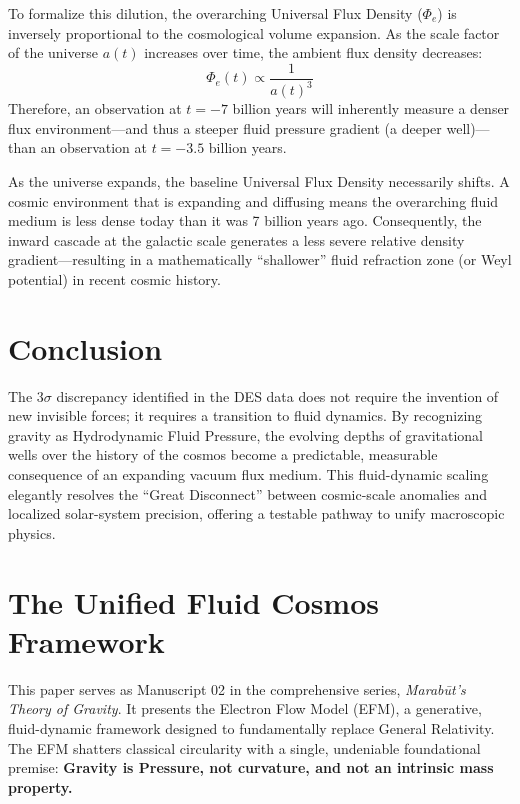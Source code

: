\documentclass[11pt, a4paper]{article}
\begin{document}
To formalize this dilution, the overarching Universal Flux Density ($\Phi_e$) is inversely proportional to the cosmological volume expansion. As the scale factor of the universe $a(t)$ increases over time, the ambient flux density decreases:
\begin{equation}
  \Phi_e(t) \propto \frac{1}{a(t)^3}
\end{equation}
Therefore, an observation at $t = -7$ billion years will inherently measure a denser flux environment---and thus a steeper fluid pressure gradient (a deeper well)---than an observation at $t = -3.5$ billion years.

As the universe expands, the baseline Universal Flux Density necessarily shifts. A cosmic environment that is expanding and diffusing means the overarching fluid medium is less dense today than it was 7 billion years ago. Consequently, the inward cascade at the galactic scale generates a less severe relative density gradient---resulting in a mathematically ``shallower'' fluid refraction zone (or Weyl potential) in recent cosmic history.

\section{Conclusion}
The $3\sigma$ discrepancy identified in the DES data does not require the invention of new invisible forces; it requires a transition to fluid dynamics. By recognizing gravity as Hydrodynamic Fluid Pressure, the evolving depths of gravitational wells over the history of the cosmos become a predictable, measurable consequence of an expanding vacuum flux medium. This fluid-dynamic scaling elegantly resolves the ``Great Disconnect'' between cosmic-scale anomalies and localized solar-system precision, offering a testable pathway to unify macroscopic physics.

\clearpage
\section*{The Unified Fluid Cosmos Framework}
  This paper serves as Manuscript 02 in the comprehensive series, \textit{Marab\={u}t's Theory of Gravity}. It presents the Electron Flow Model (EFM), a generative, fluid-dynamic framework designed to fundamentally replace General Relativity. The EFM shatters classical circularity with a single, undeniable foundational premise: \textbf{Gravity is Pressure, not curvature, and not an intrinsic mass property.}
\end{document}

